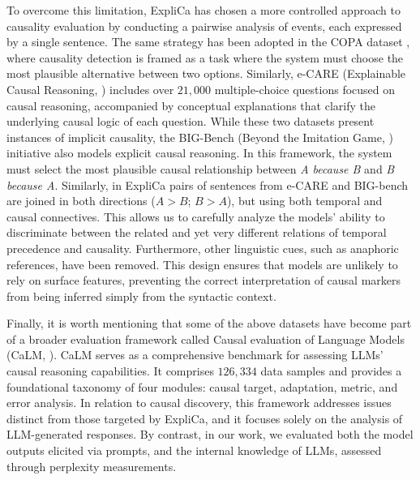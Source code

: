 To overcome this limitation, ExpliCa has chosen a more controlled approach to causality evaluation by conducting a pairwise analysis of events, each expressed by a single sentence. The same strategy has been adopted in the COPA dataset \cite{roemmele2011choice}, where causality detection is framed as a task where the system must choose the most plausible alternative between two options. Similarly, e-CARE (Explainable Causal Reasoning, \citealt{du2022care}) includes over $21,000$ multiple-choice questions focused on causal reasoning, accompanied by conceptual explanations that clarify the underlying causal logic of each question. While these two datasets present instances of implicit causality, the BIG-Bench (Beyond the Imitation Game, \citealt{srivastava2022beyond}) initiative also models explicit causal reasoning. In this framework, the system must select the most plausible causal relationship between \emph{A because B} and \emph{B because A}. Similarly, in ExpliCa pairs of sentences from e-CARE and BIG-bench are joined in both directions ($A>B$; $B>A$), but using both temporal and causal connectives. This allows us to carefully analyze the models' ability to discriminate between the related and yet very different relations of temporal precedence and causality. Furthermore, other linguistic cues, such as anaphoric references, have been removed. This design ensures that models are unlikely to rely on surface features, preventing the correct interpretation of causal markers from being inferred simply from the syntactic context.

Finally, it is worth mentioning that some of the above datasets have become part of a broader evaluation framework called Causal evaluation of Language Models (CaLM, \citealt{chen2024causal}). CaLM serves as a comprehensive benchmark for assessing LLMs' causal reasoning capabilities. It comprises $126,334$ data samples and provides a foundational taxonomy of four modules: causal target, adaptation, metric, and error analysis. In relation to causal discovery, this framework addresses issues distinct from those targeted by ExpliCa, and it focuses solely on the analysis of LLM-generated responses. By contrast, in our work, we evaluated both the model outputs elicited via prompts, and the internal knowledge of LLMs, assessed through perplexity measurements.